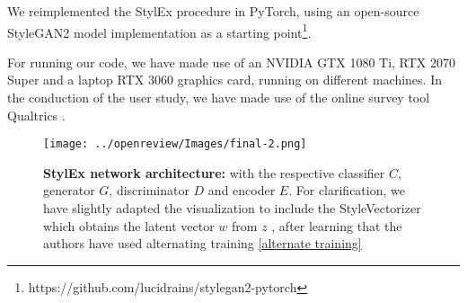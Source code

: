 We reimplemented the StylEx procedure in PyTorch, using an open-source StyleGAN2 model implementation as a starting point\footnote{https://github.com/lucidrains/stylegan2-pytorch}.

For running our code, we have made use of an NVIDIA GTX 1080 Ti, RTX 2070 Super and a laptop RTX 3060 graphics card, running on different machines. In the conduction of the user study, we have made use of the online survey tool Qualtrics \cite{qualtrics}.


\begin{comment}
The \href{https://github.com/google/explaining-in-style}{Jupyter Notebook} made available with the paper loads a pre-trained StylEx model, which is used to find and visualize classifier-specific attributes on the FFHQ dataset. The paper itself provided very little information on the implementation details of the StylEx framework. An open-source implementation in TensorFlow 2.7 was provided by the original authors, in the form of a Jupyter Notebook. However, it was quickly noted that this notebook lacked crucial elements to reproduce this research:

\begin{itemize}
    \item The only model that was provided was a StylEx model (or rather a multitude of models that encompass a singular StylEx model), which was fully trained on the FFHQ dataset with a perceived age classifier. The other datasets and classifiers reported were missing.
    \item The training code, including the hyperparameter configurations, was entirely missing from the notebook. While we could not obtain access to the training procedure code, through contact with the primary author the specifics of the optimization procedure were clarified, including the used hyperparameters configurations.
\end{itemize}

For these reasons, we have opted for a PyTorch implementation of the StylEx model and corresponding training procedure. Due to computational limitations, we evaluate the trained models on a subset of datasets present in the paper, with a reduced dimensionality of the generated images. 


The notebook does contain a TensorFlow implementation of their \textit{AttFind} algorithm, which we translated into PyTorch code for our implementation.
\end{comment}


\begin{figure}[h!]
    \centering
    \texttt{[image: ../openreview/Images/final-2.png]}
    \caption{\textbf{StylEx network architecture:} with the respective classifier $C$, generator $G$, discriminator $D$ and encoder $E$. For clarification, we have slightly adapted the visualization to include the StyleVectorizer which obtains the latent vector $w$ from $z$ \cite{karras2019style}, after learning that the authors have used alternating training \ref{alternate training}}
    \label{fig:network-architecture}
\end{figure}

